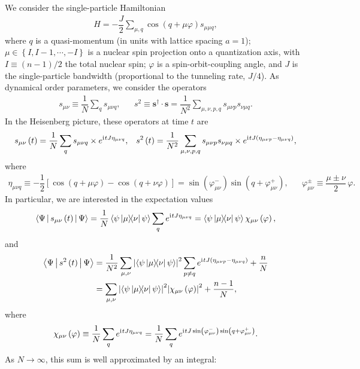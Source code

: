 \documentclass[nofootinbib,notitlepage,11pt]{revtex4-2}
\newcommand{\f}[2]{\dfrac{#1}{#2}} %
\newcommand{\p}[1]{\left(#1\right)} %
\renewcommand{\sp}[1]{\left[#1\right]} %
\renewcommand{\set}[1]{\left\{#1\right\}} %
\newcommand{\bk}{\Braket} %
\renewcommand{\v}{\bm} %
\renewcommand{\i}{\mathrm{i}\mkern1mu} %
\newcommand{\1}{\mathds{1}}
\begin{document}
We consider the single-particle Hamiltonian
\begin{align}
  H = -\f{J}{2} \sum_{\mu,q} \cos\p{q + \mu\varphi} s_{\mu\mu q},
\end{align}
where $q$ is a quasi-momentum (in units with lattice spacing $a=1$); $\mu\in\set{I,I-1,\cdots,-I}$ is a nuclear spin projection onto a quantization axis, with $I\equiv\p{n-1}/2$ the total nuclear spin; $\varphi$ is a spin-orbit-coupling angle, and $J$ is the single-particle bandwidth (proportional to the tunneling rate, $J/4$).
As dynamical order parameters, we consider the operators
\begin{align}
  s_{\mu\nu} \equiv \f1N \sum_q s_{\mu\nu q},
  &&
  s^2 \equiv \v s^\dag\cdot \v s
  = \f1{N^2} \sum_{\mu,\nu,p,q} s_{\mu\nu p} s_{\nu\mu q}.
\end{align}
In the Heisenberg picture, these operators at time $t$ are
\begin{align}
  s_{\mu\nu}\p{t} = \f1N \sum_q s_{\mu\nu q}
  \times e^{\i t J \eta_{\mu\nu q}},
  &&
  s^2\p{t} = \f1{N^2} \sum_{\mu,\nu,p,q} s_{\mu\nu p} s_{\nu\mu q}
  \times e^{\i tJ\p{\eta_{\mu\nu p}-\eta_{\mu\nu q}}},
\end{align}
where
\begin{align}
  \eta_{\mu\nu q}
  \equiv -\f12 \sp{\cos\p{q+\mu\varphi} - \cos\p{q+\nu\varphi}}
  = \sin\p{\varphi_{\mu\nu}^-} \sin\p{q+\varphi_{\mu\nu}^+},
  &&
  \varphi_{\mu\nu}^\pm \equiv \f{\mu\pm\nu}{2}\,\varphi.
\end{align}
In particular, we are interested in the expectation values
\begin{align}
  \bk{\Psi|s_{\mu\nu}\p{t}|\Psi}
  = \f1N \bk{\psi\op{\mu}{\nu}\psi} \sum_q e^{\i t J \eta_{\mu\nu q}}
  = \bk{\psi\op{\mu}{\nu}\psi} \chi_{\mu\nu}\p{\varphi},
\end{align}
and
\begin{align}
  \bk{\Psi|s^2\p{t}|\Psi}
  &= \f1{N^2} \sum_{\mu,\nu} \abs{\bk{\psi\op{\mu}{\nu}\psi}}^2
  \sum_{p\ne q} e^{\i tJ\p{\eta_{\mu\nu p}-\eta_{\mu\nu q}}} + \f{n}{N} \\
  &= \sum_{\mu,\nu} \abs{\bk{\psi\op{\mu}{\nu}\psi}}^2
  \abs{\chi_{\mu\nu}\p{\varphi}}^2 + \f{n-1}{N},
\end{align}
where
\begin{align}
  \chi_{\mu\nu}\p{\varphi} \equiv \f1N \sum_q e^{\i tJ\eta_{\mu\nu q}}
  = \f1N \sum_q e^{\i tJ\sin\p{\varphi_{\mu\nu}^-} \sin\p{q+\varphi_{\mu\nu}^+}}.
\end{align}
As $N\to\infty$, this sum is well approximated by an integral:
\end{document}
